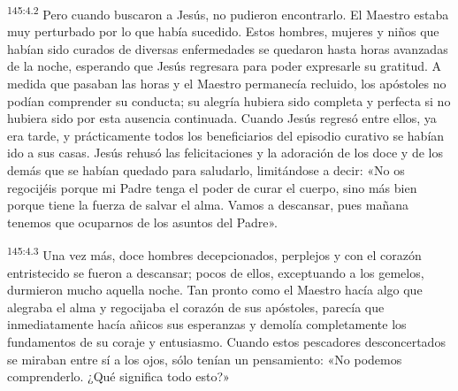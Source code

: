 \par 
\textsuperscript{145:4.2} Pero cuando buscaron a Jesús, no pudieron encontrarlo. El Maestro estaba muy perturbado por lo que había sucedido. Estos hombres, mujeres y niños que habían sido curados de diversas enfermedades se quedaron hasta horas avanzadas de la noche, esperando que Jesús regresara para poder expresarle su gratitud. A medida que pasaban las horas y el Maestro permanecía recluido, los apóstoles no podían comprender su conducta; su alegría hubiera sido completa y perfecta si no hubiera sido por esta ausencia continuada. Cuando Jesús regresó entre ellos, ya era tarde, y prácticamente todos los beneficiarios del episodio curativo se habían ido a sus casas. Jesús rehusó las felicitaciones y la adoración de los doce y de los demás que se habían quedado para saludarlo, limitándose a decir: «No os regocijéis porque mi Padre tenga el poder de curar el cuerpo, sino más bien porque tiene la fuerza de salvar el alma. Vamos a descansar, pues mañana tenemos que ocuparnos de los asuntos del Padre».

\par 
\textsuperscript{145:4.3} Una vez más, doce hombres decepcionados, perplejos y con el corazón entristecido se fueron a descansar; pocos de ellos, exceptuando a los gemelos, durmieron mucho aquella noche. Tan pronto como el Maestro hacía algo que alegraba el alma y regocijaba el corazón de sus apóstoles, parecía que inmediatamente hacía añicos sus esperanzas y demolía completamente los fundamentos de su coraje y entusiasmo. Cuando estos pescadores desconcertados se miraban entre sí a los ojos, sólo tenían un pensamiento: «No podemos comprenderlo. ¿Qué significa todo esto?»

